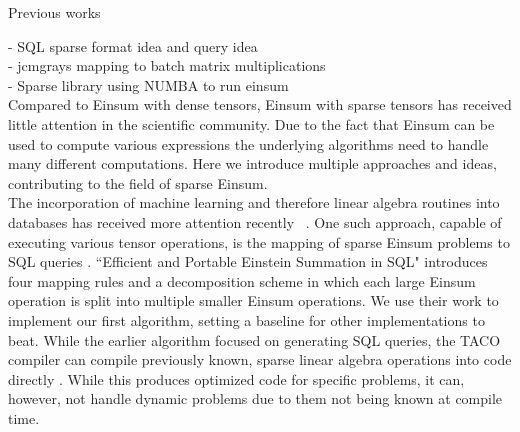 Previous works

- SQL sparse format idea and query idea~\cite{OJBD_2019v5i1n01_Marten}\\
- jcmgrays mapping to batch matrix multiplications\\
- Sparse library using NUMBA to run einsum\\



\noindent
Compared to Einsum with dense tensors, Einsum with sparse tensors has received
little attention in the scientific community. Due to the fact that Einsum can
be used to compute various expressions the underlying algorithms need to handle
many different computations. Here we introduce multiple approaches and ideas,
contributing to the field of sparse Einsum.\\
The incorporation of machine learning and therefore linear algebra routines into
databases has received more attention recently
~\cite{Machine_Learning_LinA_and_More, du2020inmachinelearningdatabasereimaginingdeep,
    deepdive, data_management_in_machine_learning}.
One such approach, capable of executing various tensor operations, is the mapping
of sparse Einsum problems to SQL queries \cite{sql_einsum}. ``Efficient and Portable Einstein
Summation in SQL" introduces four mapping rules and a decomposition scheme in which
each large Einsum operation is split into multiple smaller Einsum operations.
We use their work to implement our first algorithm, setting a baseline for other
implementations to beat.
While the earlier algorithm focused on generating SQL queries, the TACO compiler
can compile previously known, sparse linear algebra operations into code directly
\cite{taco}. While this produces optimized code for specific problems, it can, however,
not handle dynamic problems due to them not being known at compile time.
